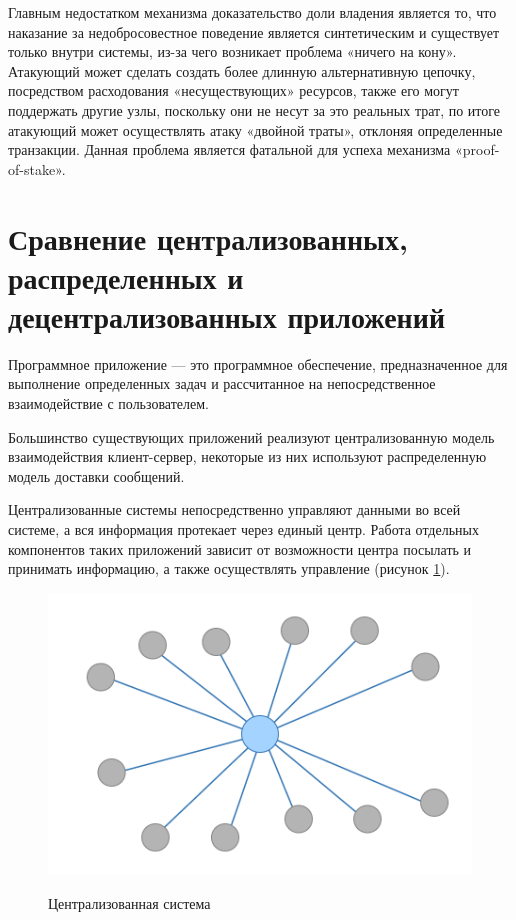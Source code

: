 Главным недостатком механизма доказательство доли владения является то, что наказание за недобросовестное поведение является синтетическим и существует только внутри системы, из-за чего возникает проблема «ничего на кону». Атакующий может сделать создать более длинную альтернативную цепочку, посредством расходования «несуществующих» ресурсов, также его могут поддержать другие узлы, поскольку они не несут за это реальных трат, по итоге атакующий может осуществлять атаку «двойной траты», отклоняя определенные транзакции. Данная проблема является фатальной для успеха механизма «proof-of-stake».

\section{Сравнение централизованных, распределенных и децентрализованных приложений}

Программное приложение — это программное обеспечение, предназначенное для выполнение определенных задач и рассчитанное на непосредственное взаимодействие с пользователем.

Большинство существующих приложений реализуют централизованную модель взаимодействия клиент-сервер, некоторые из них используют распределенную модель доставки сообщений.

Централизованные системы непосредственно управляют данными во всей системе, а вся информация протекает через единый центр. Работа отдельных компонентов таких приложений зависит от возможности центра посылать и принимать информацию, а также осуществлять управление (рисунок \ref{fig:centralization}).

\begin{figure}[H]
\begin{center}
\includegraphics[width=0.7\hsize]{fig/centralization.png}\\[2mm]
\caption{Централизованная система}\label{fig:centralization}
\end{center}
\end{figure}

